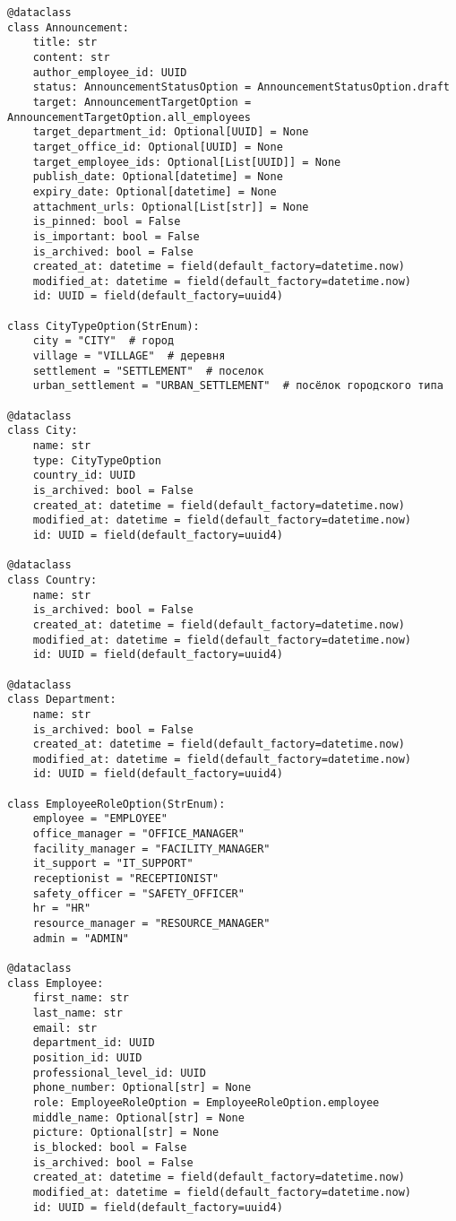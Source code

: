 \begin{lstlisting}[style=pythonstyle]
@dataclass
class Announcement:
    title: str
    content: str
    author_employee_id: UUID
    status: AnnouncementStatusOption = AnnouncementStatusOption.draft
    target: AnnouncementTargetOption = AnnouncementTargetOption.all_employees
    target_department_id: Optional[UUID] = None
    target_office_id: Optional[UUID] = None
    target_employee_ids: Optional[List[UUID]] = None
    publish_date: Optional[datetime] = None
    expiry_date: Optional[datetime] = None
    attachment_urls: Optional[List[str]] = None
    is_pinned: bool = False
    is_important: bool = False
    is_archived: bool = False
    created_at: datetime = field(default_factory=datetime.now)
    modified_at: datetime = field(default_factory=datetime.now)
    id: UUID = field(default_factory=uuid4)

class CityTypeOption(StrEnum):
    city = "CITY"  # город
    village = "VILLAGE"  # деревня
    settlement = "SETTLEMENT"  # поселок
    urban_settlement = "URBAN_SETTLEMENT"  # посёлок городского типа

@dataclass
class City:
    name: str
    type: CityTypeOption
    country_id: UUID
    is_archived: bool = False
    created_at: datetime = field(default_factory=datetime.now)
    modified_at: datetime = field(default_factory=datetime.now)
    id: UUID = field(default_factory=uuid4)

@dataclass
class Country:
    name: str
    is_archived: bool = False
    created_at: datetime = field(default_factory=datetime.now)
    modified_at: datetime = field(default_factory=datetime.now)
    id: UUID = field(default_factory=uuid4)

@dataclass
class Department:
    name: str
    is_archived: bool = False
    created_at: datetime = field(default_factory=datetime.now)
    modified_at: datetime = field(default_factory=datetime.now)
    id: UUID = field(default_factory=uuid4)

class EmployeeRoleOption(StrEnum):
    employee = "EMPLOYEE"
    office_manager = "OFFICE_MANAGER"
    facility_manager = "FACILITY_MANAGER"
    it_support = "IT_SUPPORT"
    receptionist = "RECEPTIONIST"
    safety_officer = "SAFETY_OFFICER"
    hr = "HR"
    resource_manager = "RESOURCE_MANAGER"
    admin = "ADMIN"

@dataclass
class Employee:
    first_name: str
    last_name: str
    email: str
    department_id: UUID
    position_id: UUID
    professional_level_id: UUID
    phone_number: Optional[str] = None
    role: EmployeeRoleOption = EmployeeRoleOption.employee
    middle_name: Optional[str] = None
    picture: Optional[str] = None
    is_blocked: bool = False
    is_archived: bool = False
    created_at: datetime = field(default_factory=datetime.now)
    modified_at: datetime = field(default_factory=datetime.now)
    id: UUID = field(default_factory=uuid4)


\end{lstlisting}
